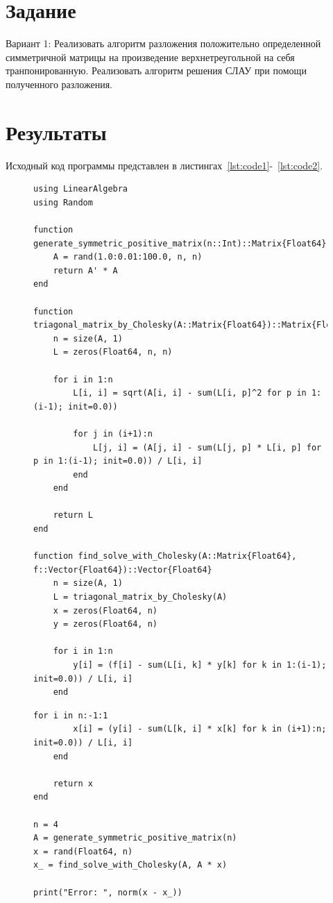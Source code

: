 \documentclass[a4paper, 14pt]{extarticle}
\begin{document}
\renewcommand{\ttdefault}{pcr}

\setlength{\tabcolsep}{3pt}
\newpage
\setcounter{page}{2}

\section{Задание}\label{Sect::task}

Вариант 1:
Реализовать алгоритм разложения положительно определенной симметричной матрицы на произведение верхнетреугольной на себя транпонированную.
Реализовать алгоритм решения СЛАУ при помощи полученного разложения.

\section{Результаты}\label{Sect::res}

Исходный код программы представлен в листингах~\ref{lst:code1}-~\ref{lst:code2}.

\begin{figure}[!htb]
\begin{lstlisting}[caption={Реализация алгоритма Холецкого},label={lst:code1}]
using LinearAlgebra
using Random

function generate_symmetric_positive_matrix(n::Int)::Matrix{Float64}
    A = rand(1.0:0.01:100.0, n, n)
    return A' * A
end

function triagonal_matrix_by_Cholesky(A::Matrix{Float64})::Matrix{Float64}
    n = size(A, 1)
    L = zeros(Float64, n, n)
    
    for i in 1:n
        L[i, i] = sqrt(A[i, i] - sum(L[i, p]^2 for p in 1:(i-1); init=0.0))

        for j in (i+1):n
            L[j, i] = (A[j, i] - sum(L[j, p] * L[i, p] for p in 1:(i-1); init=0.0)) / L[i, i]
        end
    end

    return L
end

function find_solve_with_Cholesky(A::Matrix{Float64}, f::Vector{Float64})::Vector{Float64}
    n = size(A, 1)
    L = triagonal_matrix_by_Cholesky(A)
    x = zeros(Float64, n)
    y = zeros(Float64, n)

    for i in 1:n
        y[i] = (f[i] - sum(L[i, k] * y[k] for k in 1:(i-1); init=0.0)) / L[i, i]
    end
\end{lstlisting}
\end{figure}
\begin{figure}[!htb]
\begin{lstlisting}[caption={Реализация алгоритмов оценки источников погрешностей},label={lst:code2}]
    for i in n:-1:1
        x[i] = (y[i] - sum(L[k, i] * x[k] for k in (i+1):n; init=0.0)) / L[i, i]
    end

    return x
end

n = 4
A = generate_symmetric_positive_matrix(n)
x = rand(Float64, n)
x_ = find_solve_with_Cholesky(A, A * x)

print("Error: ", norm(x - x_))

\end{lstlisting}
\end{figure}
\end{document}
